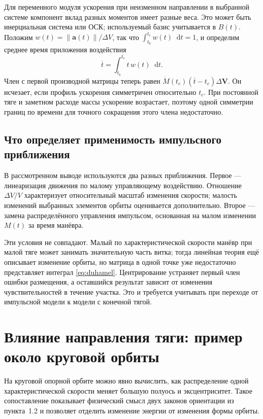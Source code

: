 \documentclass[a4paper,11pt]{article}
\newcommand{\dd}{\mathop{}\!\mathrm d}
\newcommand{\vect}[1]{\boldsymbol{#1}}
\newcommand{\norm}[1]{\left\lVert#1\right\rVert}
\numberwithin{equation}{section}
\begin{document}
Для переменного модуля ускорения при неизменном направлении
в выбранной системе компонент вклад разных моментов имеет
разные веса. Это может быть инерциальная система или ОСК;
используемый базис учитывается в $B(t)$. Положим
$w(t)=\norm{\vect a(t)}/\Delta V$, так что
$\int_{t_b}^{t_e}w(t)\dd t=1$, и определим среднее время
приложения воздействия
\[
\overline t=\int_{t_b}^{t_e}t\,w(t)\dd t.
\]
Член с первой производной матрицы теперь равен
$\dot M(t_c)(\overline t-t_c)\Delta\vect V$.
Он исчезает, если профиль ускорения симметричен относительно
$t_c$. При постоянной тяге и заметном расходе массы ускорение
возрастает, поэтому одной симметрии границ по времени
для точного сокращения этого члена недостаточно.

\subsection{Что определяет применимость импульсного приближения}

В рассмотренном выводе используются два разных приближения.
Первое --- линеаризация движения по малому управляющему
воздействию. Отношение $\Delta V/V$ характеризует относительный
масштаб изменения скорости; малость изменений выбранных
элементов орбиты оценивается дополнительно.
Второе --- замена распределённого управления импульсом,
основанная на малом изменении $M(t)$ за время манёвра.

Эти условия не совпадают. Малый по характеристической скорости
манёвр при малой тяге может занимать значительную часть витка;
тогда линейная теория ещё описывает изменение орбиты,
но матрица в одной точке уже недостаточно представляет
интеграл \eqref{eq:duhamel}.
Центрирование устраняет первый член ошибки размещения,
а оставшийся результат зависит от изменения чувствительностей
в течение участка. Это и требуется учитывать при переходе
от импульсной модели к модели с конечной тягой.

\FloatBarrier
\section{Влияние направления тяги: пример около круговой орбиты}
\label{sec:circular}

На круговой опорной орбите можно явно вычислить, как распределение
одной характеристической скорости меняет большую полуось
и эксцентриситет. Такое сопоставление показывает физический смысл
двух законов ориентации из пункта~1.2 и позволяет отделить
изменение энергии от изменения формы орбиты.
\end{document}
